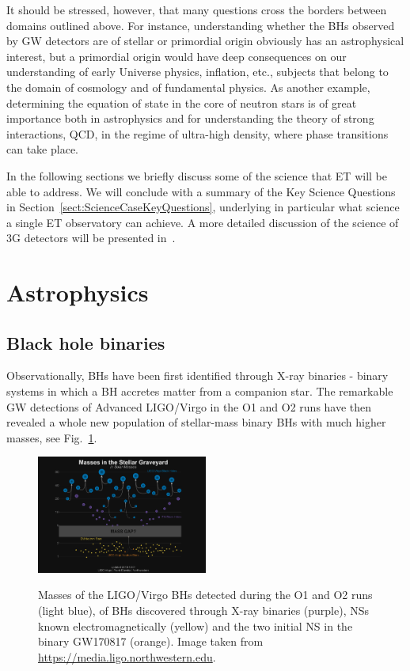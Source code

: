  
 \vspace{2mm}\noindent
It should  be stressed, however, that many questions cross the borders between  domains outlined above. For instance, understanding whether the BHs observed by GW detectors are of stellar or primordial origin obviously has an astrophysical interest, but a primordial origin would have deep consequences on  our understanding of early Universe physics, inflation, etc., subjects that belong to the domain of cosmology and of fundamental physics. As another example, determining the equation of state in the core of neutron stars is of great importance both in astrophysics and for understanding the theory of strong interactions, QCD, in the regime of ultra-high  density, where phase transitions can take place.
 
In the following sections we briefly discuss some of the science that ET will be able to address. We will conclude with a summary of the Key Science Questions in Section~\ref{sect:ScienceCaseKeyQuestions},
underlying in particular what science a single ET observatory can achieve.
A more detailed discussion of the science of 3G detectors will be presented in~\cite{3GScienceBook}.
  

\section{Astrophysics}\label{sec:astrophy}

\subsection{Black hole binaries}\label{sect:Blackholebinaries}

Observationally, BHs have been first identified through X-ray binaries - binary systems in which a BH accretes matter from a companion star. The remarkable GW detections of Advanced LIGO/Virgo in the O1 and O2 runs have then revealed a whole new population of stellar-mass binary BHs with much higher masses, see Fig.~\ref{fig:Masses}.

\begin{figure}[t]
\centering
{\includegraphics[width=0.5\textwidth]{Figures/Masses.png}}
\caption{Masses of the LIGO/Virgo BHs detected during the O1 and O2 runs (light blue), of BHs discovered through X-ray binaries (purple),
NSs known electromagnetically (yellow) and the two initial  NS in the binary GW170817 (orange). Image taken from \url{https://media.ligo.northwestern.edu}. 
\label{fig:Masses}
}
 \end{figure} 


